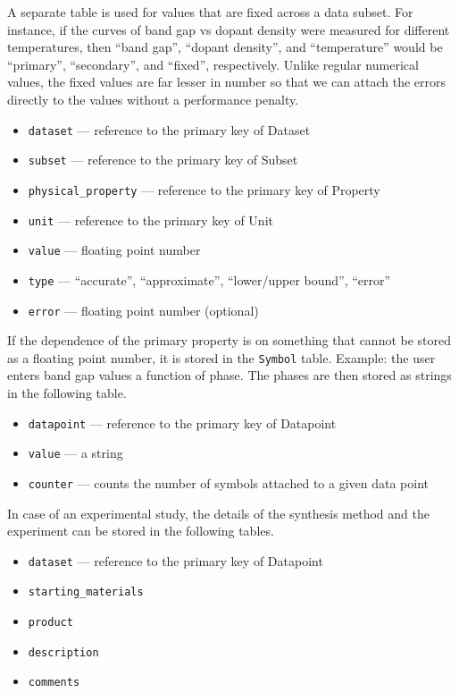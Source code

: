 \documentclass{article}
\begin{document}
A separate table is used for values that are fixed across a data subset. For instance, if the curves of band gap vs dopant density were measured for different temperatures, then ``band gap'', ``dopant density'', and ``temperature'' would be ``primary'', ``secondary'', and ``fixed'', respectively. Unlike regular numerical values, the fixed values are far lesser in number so that we can attach the errors directly to the values without a performance penalty.
\begin{tcolorbox}[colback=green!5,colframe=green!40!black,title=NumericalValueFixed(Base)]
  \begin{itemize}
  \item \texttt{dataset} --- reference to the primary key of Dataset
  \item \texttt{subset} --- reference to the primary key of Subset
  \item \texttt{physical\_property} --- reference to the primary key of Property
  \item \texttt{unit} --- reference to the primary key of Unit
  \item \texttt{value} --- floating point number
  \item \texttt{type} --- ``accurate'', ``approximate'', ``lower/upper bound'', ``error''
  \item \texttt{error} --- floating point number (optional)
  \end{itemize}
\end{tcolorbox}

If the dependence of the primary property is on something that cannot be stored as a floating point number, it is stored in the \texttt{Symbol} table. Example: the user enters band gap values a function of phase. The phases are then stored as strings in the following table.
\begin{tcolorbox}[colback=green!5,colframe=green!40!black,title=Symbol(Base)]
  \begin{itemize}
  \item \texttt{datapoint} --- reference to the primary key of Datapoint
  \item \texttt{value} --- a string
  \item \texttt{counter} --- counts the number of symbols attached to a given data point
  \end{itemize}
\end{tcolorbox}

In case of an experimental study, the details of the synthesis method and the experiment can be stored in the following tables.
\begin{tcolorbox}[colback=green!5,colframe=green!40!black,title=SynthesisMethod(Base)]
  \begin{itemize}
  \item \texttt{dataset} --- reference to the primary key of Datapoint
  \item \texttt{starting\_materials}
  \item \texttt{product}
  \item \texttt{description}
  \item \texttt{comments}
  \end{itemize}
\end{tcolorbox}
\end{document}
